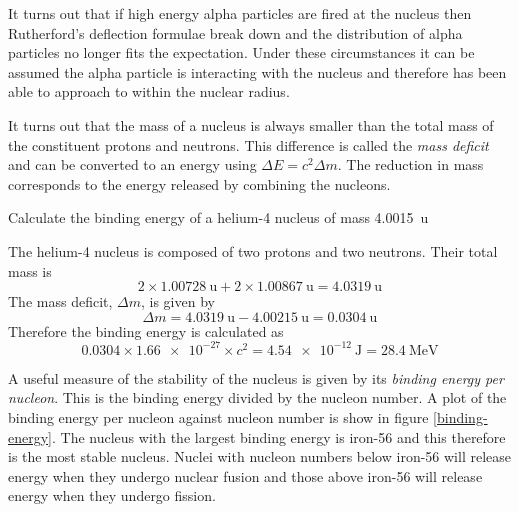 \documentclass[revision-guide.tex]{subfiles}
\begin{document}
It turns out that if high energy alpha particles are fired at the nucleus then Rutherford's deflection formulae break down and the distribution of alpha particles no longer fits the expectation. Under these circumstances it can be assumed the alpha particle is interacting with the nucleus and therefore has been able to approach to within the nuclear radius.

\newpage
{}

It turns out that the mass of a nucleus is always smaller than the total mass of the constituent protons and neutrons. This difference is called the \emph{mass deficit} and can be converted to an energy using $ \Delta E = c^2 \Delta m$. The reduction in mass corresponds to the energy released by combining the nucleons.

\begin{example}
  Calculate the binding energy of a helium-4 nucleus of mass \SI{4.0015}{\amu}

  \answer

  The helium-4 nucleus is composed of two protons and two neutrons. Their total mass is
  \[ 2\times \SI{1.00728}{\amu}+2\times \SI{1.00867}{\amu} = \SI{4.0319}{\amu} \]
  The mass deficit, $\Delta m$, is given by
  \[ \Delta m = \SI{4.0319}{\amu} - \SI{4.00215}{\amu} = \SI{0.0304}{\amu} \]
  Therefore the binding energy is calculated as
  \[ \num{0.0304} \times \num{1.66e-27} \times c^2 = \SI{4.54e-12}{\joule} = \SI{28.4}{\mega\electronvolt} \]
\end{example}

\newpage
{}

A useful measure of the stability of the nucleus is given by its \emph{binding energy per nucleon}. This is the binding energy divided by the nucleon number. A plot of the binding energy per nucleon against nucleon number is show in figure \ref{binding-energy}.  The nucleus with the largest binding energy is iron-56 and this therefore is the most stable nucleus. Nuclei with nucleon numbers below iron-56 will release energy when they undergo nuclear fusion and those above iron-56 will release energy when they undergo fission.
\end{document}
